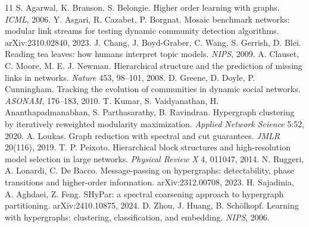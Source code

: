 \documentclass[10pt,a4paper]{article}
\begin{document}
{\footnotesize
\setlength{\bibsep}{1pt plus 0.5pt}
\begin{thebibliography}{11}
 S. Agarwal, K. Branson, S. Belongie. Higher order learning with graphs. \emph{ICML}, 2006.
 Y. Asgari, R. Cazabet, P. Borgnat. Mosaic benchmark networks: modular link streams for testing dynamic community detection algorithms. arXiv:2310.02840, 2023.
 J. Chang, J. Boyd-Graber, C. Wang, S. Gerrish, D. Blei. Reading tea leaves: how humans interpret topic models. \emph{NIPS}, 2009.
 A. Clauset, C. Moore, M. E. J. Newman. Hierarchical structure and the prediction of missing links in networks. \emph{Nature} 453, 98--101, 2008.
 D. Greene, D. Doyle, P. Cunningham. Tracking the evolution of communities in dynamic social networks. \emph{ASONAM}, 176--183, 2010.
 T. Kumar, S. Vaidyanathan, H. Ananthapadmanabhan, S. Parthasarathy, B. Ravindran. Hypergraph clustering by iteratively reweighted modularity maximization. \emph{Applied Network Science} 5:52, 2020.
 A. Loukas. Graph reduction with spectral and cut guarantees. \emph{JMLR} 20(116), 2019.
 T. P. Peixoto. Hierarchical block structures and high-resolution model selection in large networks. \emph{Physical Review X} 4, 011047, 2014.
 N. Ruggeri, A. Lonardi, C. De Bacco. Message-passing on hypergraphs: detectability, phase transitions and higher-order information. arXiv:2312.00708, 2023.
 H. Sajadinia, A. Aghdaei, Z. Feng. SHyPar: a spectral coarsening approach to hypergraph partitioning. arXiv:2410.10875, 2024.
 D. Zhou, J. Huang, B. Schölkopf. Learning with hypergraphs: clustering, classification, and embedding. \emph{NIPS}, 2006.
\end{thebibliography}
}
\end{document}
